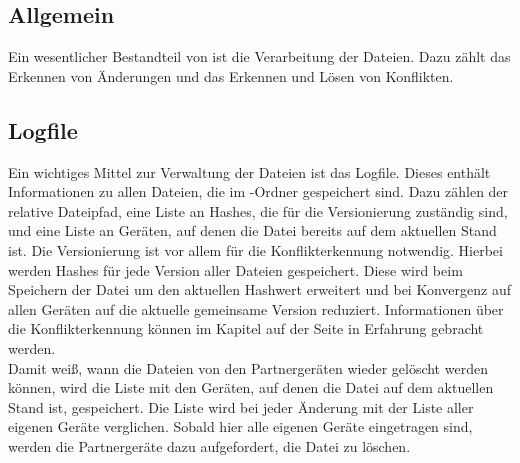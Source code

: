 \subsection{Allgemein}
Ein wesentlicher Bestandteil von \sblit ist die Verarbeitung der Dateien. Dazu zählt das Erkennen von Änderungen und das Erkennen und Lösen von Konflikten.
\subsection{Logfile}\label{Logfile}
Ein wichtiges Mittel zur Verwaltung der Dateien ist das Logfile. Dieses enthält Informationen zu allen Dateien, die im \sblit-Ordner gespeichert sind. Dazu zählen der relative Dateipfad, eine Liste an Hashes, die für die Versionierung zuständig sind, und eine Liste an Geräten, auf denen die Datei bereits auf dem aktuellen Stand ist. Die Versionierung ist vor allem für die Konflikterkennung notwendig. Hierbei werden Hashes für jede Version aller Dateien gespeichert. Diese wird beim Speichern der Datei um den aktuellen Hashwert erweitert und bei Konvergenz auf allen Geräten auf die aktuelle gemeinsame Version reduziert. Informationen über die Konflikterkennung können im Kapitel  auf der Seite \pageref{Konflikterkennung} in Erfahrung gebracht werden. \\
Damit \sblit weiß, wann die Dateien von den Partnergeräten  wieder gelöscht werden können, wird die Liste mit den Geräten, auf denen die Datei auf dem aktuellen Stand ist, gespeichert. Die Liste wird bei jeder Änderung mit der Liste aller eigenen Geräte verglichen. Sobald hier alle eigenen Geräte eingetragen sind, werden die Partnergeräte dazu aufgefordert, die Datei zu löschen. 

